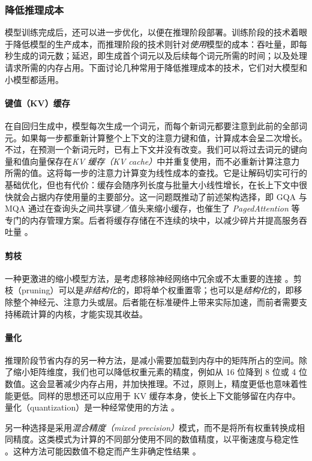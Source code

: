 \subsubsection{降低推理成本}
模型训练完成后，还可以进一步优化，以便在推理阶段部署。训练阶段的技术着眼于降低模型的生产成本，而推理阶段的技术则针对\emph{使用}模型的成本：吞吐量，即每秒生成的词元数；延迟，即生成首个词元以及后续每个词元所需的时间；以及处理请求所需的内存占用。下面讨论几种常用于降低推理成本的技术，它们对大模型和小模型都适用。

\paragraph{键值（KV）缓存} 在自回归生成中，模型每次生成一个词元，而每个新词元都要注意到此前的全部词元。如果每一步都重新计算整个上下文的注意力键和值，计算成本会呈二次增长。不过，在预测一个新词元时，已有上下文并没有改变。我们可以将过去词元的键向量和值向量保存在\emph{KV 缓存（KV cache）}中并重复使用，而不必重新计算注意力所需的值。这将每一步的注意力计算变为线性成本的查找。它是让解码切实可行的基础优化，但也有代价：缓存会随序列长度与批量大小线性增长，在长上下文中很快就会占据内存使用量的主要部分。这一问题既推动了前述架构选择，即 GQA 与 MQA 通过在查询头之间共享键／值头来缩小缓存，也催生了 \emph{PagedAttention} 等专门的内存管理方案。后者将缓存存储在不连续的块中，以减少碎片并提高服务吞吐量 \citep{kwon2023efficient}。

\paragraph{剪枝} 一种更激进的缩小模型方法，是考虑移除神经网络中冗余或不太重要的连接 \citep{ma2023llm}。剪枝（pruning）可以是\emph{非结构化}的，即将单个权重置零；也可以是\emph{结构化}的，即移除整个神经元、注意力头或层。后者能在标准硬件上带来实际加速，而前者需要支持稀疏计算的内核，才能实现其收益。

\paragraph{量化} 推理阶段节省内存的另一种方法，是减小需要加载到内存中的矩阵所占的空间。除了缩小矩阵维度，我们也可以降低权重元素的精度，例如从 16 位降到 8 位或 4 位数值。这会显著减少内存占用，并加快推理。不过，原则上，精度更低也意味着性能更低。同样的思想还可以应用于 KV 缓存本身，使长上下文能够留在内存中。量化（quantization）是一种经常使用的方法 \citep{dettmers2022gpt3, dettmers2023case, xiao2023smoothquant}。

另一种选择是采用\emph{混合精度（mixed precision）}模式，而不是将所有权重转换成相同精度。这类模式为计算的不同部分使用不同的数值精度，以平衡速度与稳定性 \citep{micikevicius2017mixed}。这种方法可能因数值不稳定而产生非确定性结果 \citep{yuan2025understanding}。

